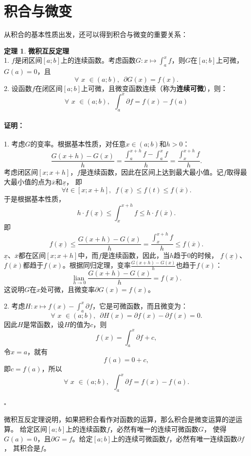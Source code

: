 \documentclass[12pt,UTF8]{ctexbook}
\newcommand{\lian}[1]{
    \underset{#1}{\operatorname{lian}\,}
}
\theoremstyle{definition}
\newtheorem{tm}{定理}[section]
\theoremstyle{plain}
\renewenvironment{proof}{\paragraph{\textbf{证明：}}}{\hfill$\square$}
\begin{document}
\section{积合与微变}
从积合的基本性质出发，还可以得到积合与微变的重要关系：

\begin{tm}{\textbf{微积互反定理}}
    \mbox{} \\
    1. $f$是闭区间$[a; b]$上的连续函数。考虑函数$G: x\mapsto \int_a^x f$，则$G$在$[a; b]$上可微，
    $G(a) = 0$，且
    $$\forall \,\, x\,\,\in(a; b), \,\,\, \partial G (x) = f(x).$$
    2. 设函数$f$在闭区间$[a; b]$上可微，且微变函数连续（称为\textbf{连续可微}），则：
    $$ \forall \,\, x\,\,\in(a; b), \,\,\, \int_a^x \partial f = f(x) - f(a) $$
\end{tm}

\begin{proof}
    1. 考虑$G$的变率。根据基本性质，对任意$x\in(a; b)$和$h>0$：
    $$ \frac{G(x+h) - G(x)}{h} = \frac{\int_a^{x+h} f - \int_a^x f}{h} = \frac{\int_x^{x+h} f}{h}. $$
    考虑闭区间$[x; x+h]$，$f$是连续函数，因此在区间上达到最大最小值。记$f$取得最大最小值的点为$\overline{x}$和$\underline{x}$，
    即
    $$ \forall t \in [x; x+h] ,\,\,\, f(\underline{x}) \leqslant f(t) \leqslant f(\overline{x}). $$
    于是根据基本性质，
    $$ h\cdot f(\underline{x}) \leqslant \int_x^{x+h} f \leqslant h\cdot f(\overline{x}). $$
    即
    $$ f(\underline{x}) \leqslant \frac{G(x+h) - G(x)}{h} = \frac{\int_x^{x+h} f}{h} \leqslant f(\overline{x}). $$
    $\underline{x}$、$\overline{x}$都在区间$[x; x+h]$中，而$f$是连续函数，因此，当$h$趋于$0$的时候，
    $f(\underline{x})$、$f(\overline{x})$都趋于$f(x)$。根据同归定理，变率$\frac{G(x+h) - G(x)}{h}$也趋于$f(x)$：
    $$ \lian{h\to 0} \frac{G(x+h) - G(x)}{h} = f(x).$$
    这说明$G$在$x$处可微，且微变率$\partial G (x) = f(x)$。

    2. 考虑$H: x\mapsto f(x) - \int_a^x \partial f$，它是可微函数，而且微变为：
    $$ \forall \,\, x\,\,\in(a; b), \,\,\, \partial H(x) = \partial f(x) - \partial f(x) = 0. $$
    因此$H$是常函数，设$H$的值为$c$，则
    $$f(x) = \int_a^x \partial f + c, $$
    令$x = a$，就有
    $$f(a) = 0 + c,$$
    即$c = f(a)$，所以
    $$ \forall \,\, x\,\,\in(a; b), \,\,\,\int_a^x \partial f = f(x) - f(a).$$

\end{proof}

微积互反定理说明，如果把积合看作对函数的运算，那么积合是微变运算的逆运算。
给定区间$[a; b]$上的连续函数$f$，必然有唯一的连续可微函数$G$，
使得$G(a) = 0$，且$\partial G = f$。给定$[a; b]$上的连续可微函数$f$，必然有唯一连续函数$\partial f$，
其积合是$f$。
\end{document}
